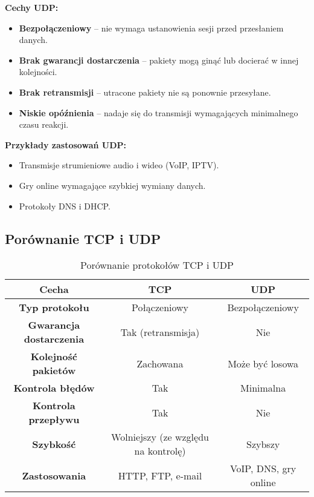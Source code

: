\textbf{Cechy UDP:}
\begin{itemize}
    \item \textbf{Bezpołączeniowy} – nie wymaga ustanowienia sesji przed przesłaniem danych.
    \item \textbf{Brak gwarancji dostarczenia} – pakiety mogą ginąć lub docierać w innej kolejności.
    \item \textbf{Brak retransmisji} – utracone pakiety nie są ponownie przesyłane.
    \item \textbf{Niskie opóźnienia} – nadaje się do transmisji wymagających minimalnego czasu reakcji.
\end{itemize}

\textbf{Przykłady zastosowań UDP:}
\begin{itemize}
    \item Transmisje strumieniowe audio i wideo (VoIP, IPTV).
    \item Gry online wymagające szybkiej wymiany danych.
    \item Protokoły DNS i DHCP.
\end{itemize}

\subsection{Porównanie TCP i UDP}

\begin{table}[h]
    \centering
    \renewcommand{\arraystretch}{1.3}
    \begin{tabular}{|c|c|c|}
        \hline
        \textbf{Cecha} & \textbf{TCP} & \textbf{UDP} \\
        \hline
        \textbf{Typ protokołu} & Połączeniowy & Bezpołączeniowy \\
        \hline
        \textbf{Gwarancja dostarczenia} & Tak (retransmisja) & Nie \\
        \hline
        \textbf{Kolejność pakietów} & Zachowana & Może być losowa \\
        \hline
        \textbf{Kontrola błędów} & Tak & Minimalna \\
        \hline
        \textbf{Kontrola przepływu} & Tak & Nie \\
        \hline
        \textbf{Szybkość} & Wolniejszy (ze względu na kontrolę) & Szybszy \\
        \hline
        \textbf{Zastosowania} & HTTP, FTP, e-mail & VoIP, DNS, gry online \\
        \hline
    \end{tabular}
    \caption{Porównanie protokołów TCP i UDP}
\end{table}

